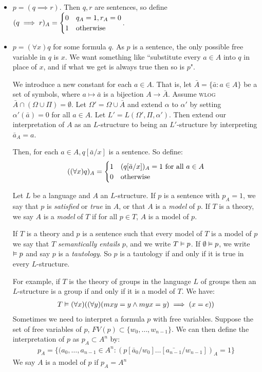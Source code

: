 \documentclass[10pt,a4paper]{article}
\begin{document}
\begin{itemize}
\item $p = (q \implies r)$. Then $q,r$ are sentences, so define $(q \implies r)_A = \begin{cases} 0 & q_A = 1, r_A = 0\\ 1 & \text{otherwise}\end{cases}$.

\item $p = (\forall x)q$ for some formula $q$. As $p$ is a sentence, the only possible free variable in $q$ is $x$. We want something like ``substitute every $a \in A$ into $q$ in place of $x$, and if what we get is always true then so is $p$".

We introduce a new constant for each $a \in A$. That is, let $\bar{A} = \{\bar{a}:a \in A\}$ be a set of symbols, where $a \mapsto \bar{a}$ is a bijection $A \to \bar{A}$. Assume \textsc{wlog} $\bar{A} \cap (\Omega \cup \Pi) = \emptyset$. Let $\Omega' = \Omega \cup \bar{A}$ and extend $\alpha$ to $\alpha'$ by setting $\alpha'(\bar{a}) = 0$ for all $a \in A$. Let $L' = L(\Omega', \Pi, \alpha')$. Then extend our interpretation of $A$ as an $L$-structure to being an $L'$-structure by interpreting $\bar{a}_A = a$.

Then, for each $a \in A, q[\bar{a}/x]$ is a sentence. So define:
\begin{align*}
((\forall x)q)_A = \begin{cases} 1 & (q[\bar{a}/x])_A = 1 \text{ for all } a \in A \\ 0 & \text{otherwise} \end{cases}
\end{align*}

Let $L$ be a language and $A$ an $L$-structure. If $p$ is a sentence with $p_A = 1$, we say that $p$ is \emph{satisfied} or \emph{true} in $A$, or that $A$ is a \emph{model} of $p$. If $T$ is a theory, we say $A$ is a \emph{model} of $T$ if for all $p \in T$, $A$ is a model of $p$.

If $T$ is a theory and $p$ is a sentence such that every model of $T$ is a model of $p$ we say that $T$ \emph{semantically entails} $p$, and we write $T \vDash p$. If $\emptyset \vDash p$, we write $\vDash p$ and say $p$ is a \emph{tautology}. So $p$ is a tautology if and only if it is true in every $L$-structure.

For example, if $T$ is the theory of groups in the language $L$ of groups then an $L$-structure is a group if and only if it is a model of $T$. We have:
\begin{align*}
T \vDash (\forall x)((\forall y)(mxy=y \wedge myx = y)\implies(x=e))
\end{align*}
Sometimes we need to interpret a formula $p$ with free variables. Suppose the set of free variables of $p$, $FV(p) \subset \{w_0, \ldots, w_{n-1}\}$. We can then define the interpretation of $p$ as $p_A \subset A^n$ by:
\begin{align*}
p_A = \{(a_0, \ldots, a_{n-1} \in A^n : (p[\bar{a}_0/w_0]\ldots[\bar{a_{n-1}}/w_{n-1}])_A = 1\}
\end{align*}
We say $A$ is a model of $p$ if $p_A = A^n$
\end{itemize}
\end{document}
